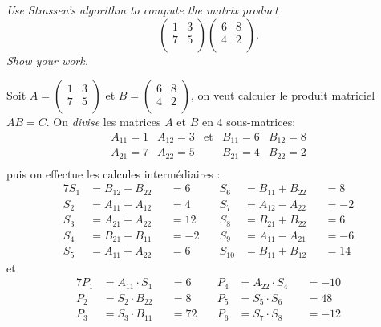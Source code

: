 \begin{description}
   {\itshape Use Strassen’s algorithm to compute the matrix product \[\begin{pmatrix}
      1 & 3\\
      7 & 5\\
    \end{pmatrix}
    \begin{pmatrix}
      6 & 8\\
      4 & 2\\
    \end{pmatrix}.\] 
  Show your work.}

    \begin{ex}
      Soit $A = \begin{pmatrix}
      1 & 3\\
      7 & 5\\   
    \end{pmatrix} $ et $ B = \begin{pmatrix}
      6 & 8\\
      4 & 2\\
    \end{pmatrix}$, on veut calculer le produit matriciel $AB=C$.
    On {\it divise} les matrices $A$ et $B$ en $4$ sous-matrices: \[\begin{array}{ccccc}
      A_{11} = 1 & A_{12} = 3 & \text{et} & B_{11} = 6& B_{12} = 8\\
      A_{21} = 7 & A_{22} = 5 &&B_{21} = 4& B_{22} = 2\\
    \end{array}
    \] puis on effectue les calcules intermédiaires :
    \begin{alignat*}{7}
    S_1 &= B_{12} - B_{22} &&= 6 &\quad S_6&=B_{11} + B_{22}&&= 8\\
    S_2 &= A_{11} + A_{12} &&= 4 &\quad S_7&=A_{12} - A_{22}&&=-2\\
    S_3 &= A_{21} + A_{22} &&= 12 &\quad S_8&=B_{21}+ B_{22} &&=6\\
    S_4 &= B_{21} - B_{11} &&= -2&\quad S_9&=A_{11}-A_{21}&&=-6\\
    S_5 &= A_{11} + A_{22} &&= 6 &\quad S_{10}&=B_{11}+B_{12}&&=14
    \end{alignat*} et
    \begin{alignat*}{7}
      P_1 &= A_{11}\cdot S_1 &&= 6 &\quad P_4 &= A_{22}\cdot S_4 &&=  -10\\
      P_2 &= S_2\cdot B_{22} &&= 8 &\quad P_5 &= S_5\cdot S_6 &&= 48\\
      P_3 &= S_3\cdot B_{11} &&= 72 &\quad P_6 &= S_7\cdot S_8 &&= -12\\

\end{alignat*}
\end{ex}
\end{description}
